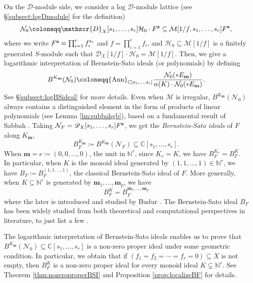 \documentclass{amsart}
\theoremstyle{plain}
\numberwithin{theorem}{section}
\theoremstyle{definition}
\theoremstyle{remark}
\theoremstyle{definition}
\newcommand{\C}{\mathbb{C}} %
\newcommand{\N}{\mathbb{N}}
\newcommand{\cH}{\mathcal{H}}
\newcommand{\cM}{\mathcal{M}}
\newcommand{\cN}{\mathcal{N}}
\newcommand{\bm}{\mathbf{m}}
\newcommand{\shD}{\mathscr{D}}
\newcommand{\bs}{{\bf s}}
\newcommand{\Ann}{{\textup{Ann}}}
\begin{document}
On the $\shD$-module side, we consider a log $\shD$-module lattice (see \S\ref{subsect:logDmodule} for the definition) 
\[\cN_0\coloneqq\shD_X[s_1,\dots,s_r]\cH_0\cdot F^\bs\subseteq \cM[1/f,s_1,\dots,s_r]F^\bs,\]
where we write $F^\bs=\prod_{i=1}^rf_i^{s_i}$ and $f=\prod_{i=1}^rf_i$,
and $\cH_0\subseteq\cM[1/f]$ is a finitely generated $S$-module such that $\shD_X[1/f]\cdot \cH_0=\cM[1/f]$. Then, we give a logarithmic interpretation of Bernstein-Sato ideals (or polynomials) by defining 
\[B^{K_\bm}(\cN_0)\coloneqq \Ann_{\C[s_1,\dots,s_r]}\frac{\cN_0(*E_\bm)}{\alpha(K)\cdot\cN_0(*E_\bm) 
}.\]
See \S\ref{subsect:logBSideal} for more details.
Even when $\cM$ is irregular, $B^{K_\bm}(\cN_0)$ always contains a distinguished element in the form of products of linear polynomials (see Lemma \ref{lm:subbahgb}), based on a fundamental result of Sabbah \cite{Sab}. Taking $\cN_F=\shD_X[s_1,\dots,s_r]F^\bs$, we get the \emph{Bernstein-Sato ideals} of $F$ along $K_\bm$, 
\[B^{K_\bm}_F\coloneqq B^{K_\bm}(\cN_F)\subseteq \C[s_1,\dots,s_r].\]
When $\bm=e\coloneqq(0,0,\dots,0)$, the unit in $\N^r$, since $K_e=K$, we have $B^{K_e}_F=B^{K}_F$. In particular, when $K$ is the monoid ideal generated by $(1,1,\dots,1)\in \N^r$, we have $B_F\coloneqq B_F^{(1,1,\dots,1)}$, the classical Bernstein-Sato ideal of $F$. More generally,
when $K\subseteq \N^r$ is generated by $\bm_1,\dots,\bm_p$, we have 
\[B_F^K=B_F^{\bm_1,\dots,\bm_p}\]
where the later is introduced and studied by Budur \cite[\S4]{Budur}. The Bernstein-Sato ideal $B_F$ has been widely studied from both theoretical and computational perspectives in literature, to just list a few \cite{May97, BMMBSI, Bahl, CaLie, Mai, Bath, OkTak, UchaCas, BaOK,DGPS}.

The logarithmic interpretation of Bernstein-Sato ideals enables us to prove that $B^{K_\bm}(\cN_0)\subseteq\C[s_1,\dots,s_r]$ is a non-zero proper ideal under some geometric condition.  In particular, we obtain that if $(f_1=f_2=\cdots=f_r=0)\subseteq X$ is not empty, then $B_F^K$ is a non-zero proper ideal for every monoid ideal $K\subsetneq \N^r$. See Theorem \ref{thm:nozeroproperBSI} and Proposition \ref{prop:localizeBF} for details.
\end{document}
